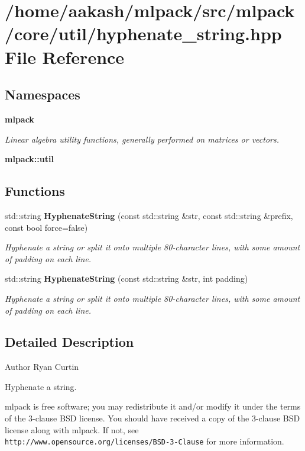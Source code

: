 \section{/home/aakash/mlpack/src/mlpack/core/util/hyphenate\+\_\+string.hpp File Reference}
\label{hyphenate__string_8hpp}
\subsection*{Namespaces}
\begin{DoxyCompactItemize}
\item 
 \textbf{ mlpack}
\begin{DoxyCompactList}\small\item\em Linear algebra utility functions, generally performed on matrices or vectors. \end{DoxyCompactList}\item 
 \textbf{ mlpack\+::util}
\end{DoxyCompactItemize}
\subsection*{Functions}
\begin{DoxyCompactItemize}
\item 
std\+::string \textbf{ Hyphenate\+String} (const std\+::string \&str, const std\+::string \&prefix, const bool force=false)
\begin{DoxyCompactList}\small\item\em Hyphenate a string or split it onto multiple 80-\/character lines, with some amount of padding on each line. \end{DoxyCompactList}\item 
std\+::string \textbf{ Hyphenate\+String} (const std\+::string \&str, int padding)
\begin{DoxyCompactList}\small\item\em Hyphenate a string or split it onto multiple 80-\/character lines, with some amount of padding on each line. \end{DoxyCompactList}\end{DoxyCompactItemize}


\subsection{Detailed Description}
\begin{DoxyAuthor}{Author}
Ryan Curtin
\end{DoxyAuthor}
Hyphenate a string.

mlpack is free software; you may redistribute it and/or modify it under the terms of the 3-\/clause B\+SD license. You should have received a copy of the 3-\/clause B\+SD license along with mlpack. If not, see {\tt http\+://www.\+opensource.\+org/licenses/\+B\+S\+D-\/3-\/\+Clause} for more information. 